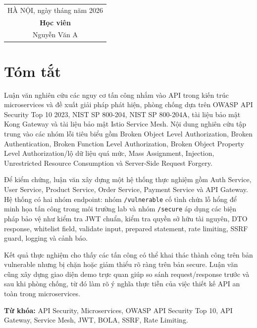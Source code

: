 \documentclass[14pt,a4paper]{extreport}
\newcommand{\studentname}{Nguyễn Văn A}
\newcommand{\city}{HÀ NỘI}
\newcommand{\yearnumber}{2026}
\begin{document}
\vspace{1.5cm}
\begin{flushright}
\begin{tabular}{c}
\city, ngày \hspace{1cm} tháng \hspace{1cm} năm \yearnumber\\[0.4cm]
\textbf{Học viên}\\[2.2cm]
\studentname
\end{tabular}
\end{flushright}
\newpage

\chapter*{Tóm tắt}
Luận văn nghiên cứu các nguy cơ tấn công nhắm vào API trong kiến trúc microservices và đề xuất giải pháp phát hiện, phòng chống dựa trên OWASP API Security Top 10 2023, NIST SP 800-204, NIST SP 800-204A, tài liệu bảo mật Kong Gateway và tài liệu bảo mật Istio Service Mesh. Nội dung nghiên cứu tập trung vào các nhóm lỗi tiêu biểu gồm Broken Object Level Authorization, Broken Authentication, Broken Function Level Authorization, Broken Object Property Level Authorization/lộ dữ liệu quá mức, Mass Assignment, Injection, Unrestricted Resource Consumption và Server-Side Request Forgery.

Để kiểm chứng, luận văn xây dựng một hệ thống thực nghiệm gồm Auth Service, User Service, Product Service, Order Service, Payment Service và API Gateway. Hệ thống có hai nhóm endpoint: nhóm \texttt{/vulnerable} cố tình chứa lỗ hổng để minh họa tấn công trong môi trường lab và nhóm \texttt{/secure} áp dụng các biện pháp bảo vệ như kiểm tra JWT chuẩn, kiểm tra quyền sở hữu tài nguyên, DTO response, whitelist field, validate input, prepared statement, rate limiting, SSRF guard, logging và cảnh báo.

Kết quả thực nghiệm cho thấy các tấn công có thể khai thác thành công trên bản vulnerable nhưng bị chặn hoặc giảm thiểu rõ ràng trên bản secure. Luận văn cũng xây dựng giao diện demo trực quan giúp so sánh request/response trước và sau khi phòng chống, từ đó làm rõ ý nghĩa thực tiễn của việc thiết kế API an toàn trong microservices.

\textbf{Từ khóa:} API Security, Microservices, OWASP API Security Top 10, API Gateway, Service Mesh, JWT, BOLA, SSRF, Rate Limiting.
\newpage

\tableofcontents
\newpage
\listoftables
{}
\newpage
\listoffigures
{}
\newpage
\end{document}
